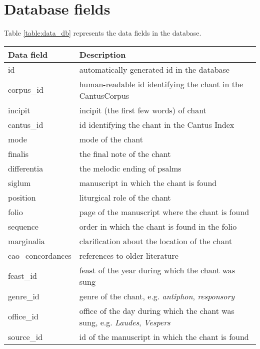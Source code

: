 \section{Database fields}
\label{section:db_fields}

Table \ref{table:data_db} represents the data fields in the database.

\begin{longtable}{| p{} | p{} |} 

 \hline
 Data field & Description \\
 \hline
 id             & automatically generated id in the database \\ \hline
 corpus\_id     & human-readable id identifying the chant in the CantusCorpus \\ \hline
 incipit        & incipit (the first few words) of chant \\ \hline
 cantus\_id     & id identifying the chant in the Cantus Index \\ \hline
 mode           & mode of the chant \\ \hline
 finalis        & the final note of the chant \\ \hline
 differentia    & the melodic ending of psalms \\ \hline
 siglum         & manuscript in which the chant is found \\ \hline
 position       & liturgical role of the chant \\ \hline
 folio          & page of the manuscript where the chant is found \\ \hline
 sequence       & order in which the chant is found in the folio \\ \hline
 marginalia     & clarification about the location of the chant \\ \hline
 cao\_concordances & references to older literature \\ \hline
 feast\_id      & feast of the year during which the chant was sung \\ \hline
 genre\_id      & genre of the chant, e.g. \emph{antiphon}, \emph{responsory} \\ \hline
 office\_id     & office of the day during which the chant was sung, e.g. \emph{Laudes}, \emph{Vespers} \\ \hline
 source\_id     & id of the manuscript in which the chant is found \\ \hline

\end{longtable}
